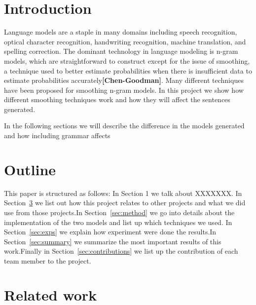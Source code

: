 \documentclass[a4paper,12pt]{article}
\begin{document}
\section{Introduction} %
\label{sec:intro}

Language models are a staple in many domains including speech recognition, optical character
recognition, handwriting recognition, machine translation, and spelling correction. The dominant technology in language modeling is n-gram models, which are straightforward to construct except for the issue of smoothing, a technique used to better estimate probabilities when there is insufficient data to estimate probabilities accurately\textbf{[Chen-Goodman]}. Many different techniques have been proposed for smoothing n-gram models. In this project we show how different smoothing techniques work and how they will affect the sentences generated.

In the following sections we will describe the difference in the models generated and how including grammar affects




\section{Outline}
This paper is structured as follows: In Section 1 we talk about XXXXXXX. In Section~\ref{sec:relwork} we list out how this project relates to other projects and what we did use from those projects.In Section~\ref{sec:method} we go into details about the implementation of the two models and list up which techniques we used. In Section~\ref{sec:exps} we explain how experiment were done the results.In Section~\ref{sec:summary} we summarize the most important results of this work.Finally in Section~\ref{sec:contributions} we list up the contribution of each team member to the project.

\section{Related work}
\label{sec:relwork}



\end{document}
